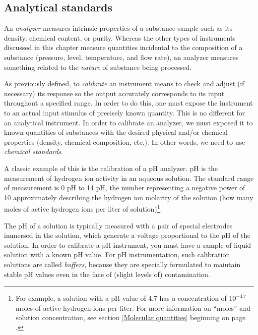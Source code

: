 \filbreak
\subsection{Analytical standards}

An \textit{analyzer} measures intrinsic properties of a substance sample such as its density, chemical content, or purity.  Whereas the other types of instruments discussed in this chapter measure quantities incidental to the composition of a substance (pressure, level, temperature, and flow rate), an analyzer measures something related to the \textit{nature} of substance being processed. 

As previously defined, to \textit{calibrate} an instrument means to check and adjust (if necessary) its response so the output accurately corresponds to its input throughout a specified range.  In order to do this, one must expose the instrument to an actual input stimulus of precisely known quantity.  This is no different for an analytical instrument.  In order to calibrate an analyzer, we must exposed it to known quantities of substances with the desired physical and/or chemical properties (density, chemical composition, etc.).  In other words, we need to use \textit{chemical standards}.  

A classic example of this is the calibration of a pH analyzer.  pH is the measurement of hydrogen ion activity in an aqueous solution.  The standard range of measurement is 0 pH to 14 pH, the number representing a negative power of 10 approximately describing the hydrogen ion molarity of the solution (how many moles of active hydrogen ions per liter of solution)\footnote{For example, a solution with a pH value of 4.7 has a concentration of $10^{-4.7}$ moles of active hydrogen ions per liter.  For more information on ``moles'' and solution concentration, see section \ref{Molecular quantities} beginning on page \pageref{Molecular quantities}.}.  

\label{pH buffer}

The pH of a solution is typically measured with a pair of special electrodes immersed in the solution, which generate a voltage proportional to the pH of the solution.  In order to calibrate a pH instrument, you must have a sample of liquid solution with a known pH value.  For pH instrumentation, such calibration solutions are called \textit{buffers}, because they are specially formulated to maintain stable pH values even in the face of (slight levels of) contamination.  

